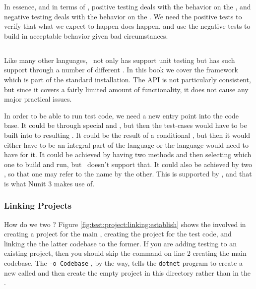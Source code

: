 In essence, and in terms of , positive testing deals with the behavior on the , and negative testing deals with the behavior on the . We need the positive tests to verify that what we expect to happen does happen, and use the negative tests to build  in acceptable behavior given bad circumstances.

\subsection{\csharp}

Like many other languages, \csharp\ not only has support unit testing but has such support through a number of different . In this book we cover the  framework which is part of the standard  installation. The API is not particularly consistent, but since it covers a fairly limited amount of functionality, it does not cause any major practical issues.

In order to be able to run test code, we need a new entry point into the code base. It could be  through special  and , but then the test-cases would have to be built into to resulting . It could be the result of a conditional , but then it would either have to be an integral part of the language or the language would need to have  for it. It could be achieved by having two  methods and then selecting which one to build and run, but \csharp\ doesn't support that. It could also be achieved by  two , so that one may refer to the name  by the other. This is supported by \csharp, and that is what Nunit 3 makes use of.

\subsubsection{Linking Projects}

How do we  two ? Figure \ref{fig:test:project:linking:establish} shows the  involved in creating a project for the main , creating the project for the test code, and linking the the latter codebase to the former. If you are adding testing to an existing project, then you should skip the command on line 2 creating the main codebase. The \texttt{-o Codebase} , by the way, tells the \texttt{dotnet} program to create a new  called  and then create the empty project in this directory rather than in the .

